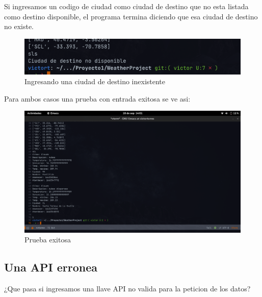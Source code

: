 \documentclass[12pt]{article}
\begin{document}
Si ingresamos un codigo de ciudad como ciudad de destino que no esta listada como destino disponible, el programa termina diciendo que esa ciudad de destino no existe.
\begin{figure}[ht]
  \centering
  \includegraphics[scale=0.5]{figures/ciudadDmal}
  \caption{Ingresando una ciudad de destino inexistente}
\end{figure}
\newpage
Para ambos casos una prueba con entrada exitosa se ve asi:
\begin{figure}[ht]
  \centering
  \includegraphics[scale=0.3]{figures/pruebaBuena}
  \caption{Prueba exitosa}
\end{figure}
\subsection{Una API erronea}
¿Que pasa si ingresamos una llave API no valida para la peticion de los datos?
\end{document}
